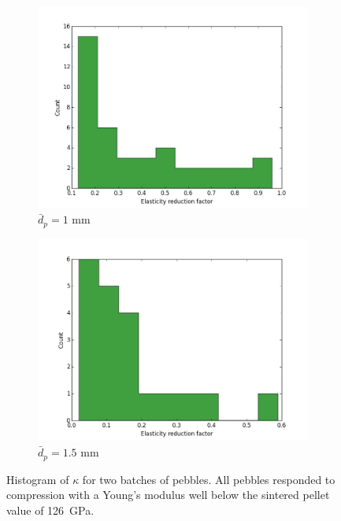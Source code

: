 \begin{figure}
        \centering
        \begin{subfigure}[b]{\imagewidth}
                \includegraphics[width=\textwidth]{chapters/figures/nfri-1mm-kappa-histogram.png}
                \caption{$\bar{d}_p = 1$ mm}
                \label{fig:nfri-1mm-kappa-hist}
        \end{subfigure}

        \begin{subfigure}[b]{\imagewidth}
                \includegraphics[width=\textwidth]{chapters/figures/nfri-1.5mm-kappa-histogram.png}
                \caption{$\bar{d}_p = 1.5$ mm}
                \label{fig:nfri-1.5mm-kappa-hist}
        \end{subfigure}
        \caption{Histogram of $\kappa$ for two batches of \lit pebbles. All pebbles responded to compression with a Young's modulus well below the sintered pellet value of \si{126 GPa}.}\label{fig:nfri-kappa-hist}
\end{figure}


